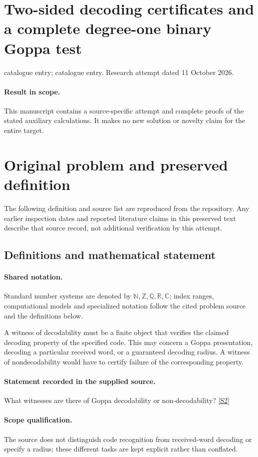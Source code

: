 \documentclass[11pt]{article}
\begin{document}
\section*{Two-sided decoding certificates and a complete degree-one binary Goppa test}
\noindent catalogue entry; catalogue entry. Research attempt dated 11 October 2026.
\paragraph{Result in scope.}This manuscript contains a source-specific attempt and complete proofs of the stated auxiliary calculations. It makes no new solution or novelty claim for the entire target.
\section{Original problem and preserved definition}
The following definition and source list are reproduced from the repository. Any earlier inspection dates and reported literature claims in this preserved text describe that source record, not additional verification by this attempt.
\subsection{Definitions and mathematical statement}

\paragraph{Shared notation.}Standard number systems are denoted by $\mathbb N,\mathbb Z,\mathbb Q,\mathbb R,\mathbb C$; index ranges, computational models and specialized notation follow the cited problem source and the definitions below.


A witness of decodability must be a finite object that verifies the claimed decoding property of the specified code. This may concern a Goppa presentation, decoding a particular received word, or a guaranteed decoding radius. A witness of nondecodability would have to certify failure of the corresponding property.
\paragraph{Statement recorded in the supplied source.}
What witnesses are there of Goppa decodability or non-decodability? \href{http://aimpl.org/quantumalg/1/}{[S2]}
\paragraph{Scope qualification.}
The source does not distinguish code recognition from received-word decoding or specify a radius; these different tasks are kept explicit rather than conflated.
\end{document}
